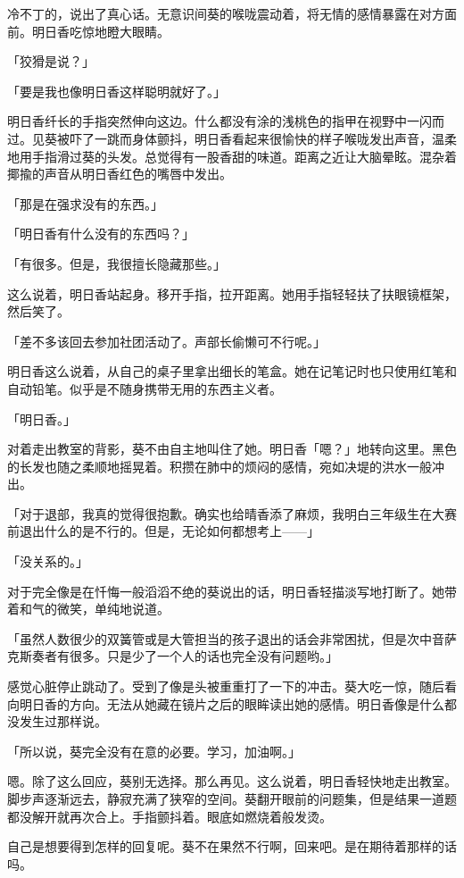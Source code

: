 \documentclass[UTF8]{ctexart}
\begin{document}
    冷不丁的，说出了真心话。无意识间葵的喉咙震动着，将无情的感情暴露在对方面前。明日香吃惊地瞪大眼睛。

    「狡猾是说？」

    「要是我也像明日香这样聪明就好了。」

    明日香纤长的手指突然伸向这边。什么都没有涂的浅桃色的指甲在视野中一闪而过。见葵被吓了一跳而身体颤抖，明日香看起来很愉快的样子喉咙发出声音，温柔地用手指滑过葵的头发。总觉得有一股香甜的味道。距离之近让大脑晕眩。混杂着揶揄的声音从明日香红色的嘴唇中发出。

    「那是在强求没有的东西。」

    「明日香有什么没有的东西吗？」

    「有很多。但是，我很擅长隐藏那些。」

    这么说着，明日香站起身。移开手指，拉开距离。她用手指轻轻扶了扶眼镜框架，然后笑了。

    「差不多该回去参加社团活动了。声部长偷懒可不行呢。」

    明日香这么说着，从自己的桌子里拿出细长的笔盒。她在记笔记时也只使用红笔和自动铅笔。似乎是不随身携带无用的东西主义者。

    「明日香。」

    对着走出教室的背影，葵不由自主地叫住了她。明日香「嗯？」地转向这里。黑色的长发也随之柔顺地摇晃着。积攒在肺中的烦闷的感情，宛如决堤的洪水一般冲出。

    「对于退部，我真的觉得很抱歉。确实也给晴香添了麻烦，我明白三年级生在大赛前退出什么的是不行的。但是，无论如何都想考上——」

    「没关系的。」

    对于完全像是在忏悔一般滔滔不绝的葵说出的话，明日香轻描淡写地打断了。她带着和气的微笑，单纯地说道。

    「虽然人数很少的双簧管或是大管担当的孩子退出的话会非常困扰，但是次中音萨克斯奏者有很多。只是少了一个人的话也完全没有问题哟。」

    感觉心脏停止跳动了。受到了像是头被重重打了一下的冲击。葵大吃一惊，随后看向明日香的方向。无法从她藏在镜片之后的眼眸读出她的感情。明日香像是什么都没发生过那样说。

    「所以说，葵完全没有在意的必要。学习，加油啊。」

    嗯。除了这么回应，葵别无选择。那么再见。这么说着，明日香轻快地走出教室。脚步声逐渐远去，静寂充满了狭窄的空间。葵翻开眼前的问题集，但是结果一道题都没解开就再次合上。手指颤抖着。眼底如燃烧着般发烫。

    自己是想要得到怎样的回复呢。葵不在果然不行啊，回来吧。是在期待着那样的话吗。
\end{document}
